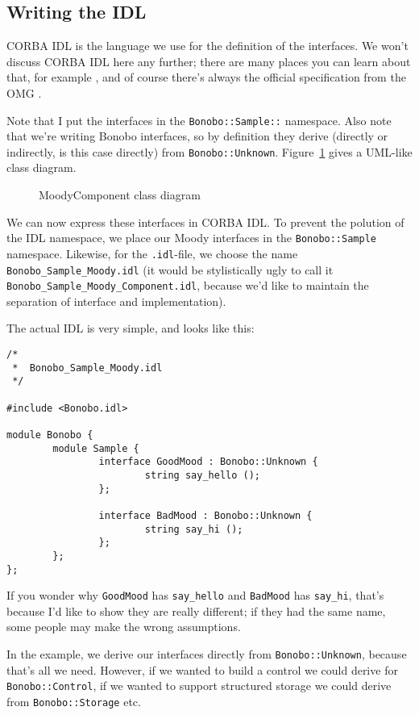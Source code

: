 \documentclass[final,10pt]{article}
\begin{document}
\subsection{Writing the IDL}
CORBA IDL is the language we use for the definition of the
interfaces. We won't discuss CORBA IDL here any further; there are
many places you can learn about that, for example \cite{HV99}, 
and of course there's always 
the official specification from the OMG \cite{omg}.

Note that I put the interfaces in
the \verb|Bonobo::Sample::| namespace. Also note that we're writing
Bonobo interfaces, so by definition they derive (directly or
indirectly, is this case directly) from \verb|Bonobo::Unknown|.
Figure~\ref{fig:moods-uml} gives a UML-like class diagram.
\begin{figure}[ht]
  \centerline{%
    \epsfxsize=80mm
    }
  \caption{MoodyComponent class diagram}
  {\label{fig:moods-uml}}
\end{figure}
We can now express these interfaces in CORBA IDL. To prevent the
polution of the IDL namespace, we place our Moody interfaces
in the \verb|Bonobo::Sample| namespace. Likewise, for the 
\verb|.idl|-file, we choose the name \verb|Bonobo_Sample_Moody.idl|
(it would be stylistically ugly to call it
\verb|Bonobo_Sample_Moody_Component.idl|, because we'd like to maintain
the separation of interface and implementation).

The actual IDL is very simple, and looks like this:
\begin{verbatim}
/*
 *  Bonobo_Sample_Moody.idl
 */

#include <Bonobo.idl>

module Bonobo {
        module Sample {
                interface GoodMood : Bonobo::Unknown {
                        string say_hello ();        
                };
        
                interface BadMood : Bonobo::Unknown {
                        string say_hi ();
                };
        };
};

\end{verbatim}
If you wonder why \verb|GoodMood| has \verb|say_hello| and
\verb|BadMood| has \verb|say_hi|, that's because I'd like to show they
are really different; if they had the same name, some people may
make the wrong assumptions.

In the example, we derive our interfaces directly from
\verb|Bonobo::Unknown|, because that's all we need. However, if we
wanted to build a control we could derive for \verb|Bonobo::Control|,
if we wanted to support structured storage we could derive from
\verb|Bonobo::Storage| etc.
\end{document}

